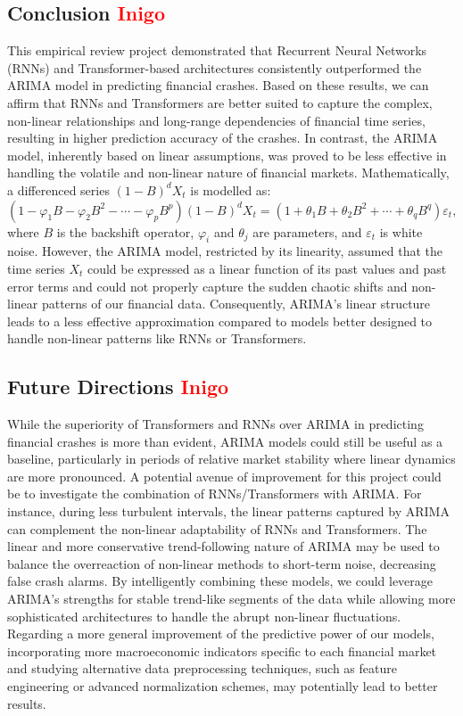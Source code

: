 \documentclass[12pt, letterpaper]{article}
\begin{document}
\subsection*{Conclusion \textcolor{red}{Inigo}}
This empirical review project demonstrated that Recurrent Neural Networks (RNNs) and Transformer-based architectures consistently outperformed the ARIMA model in predicting financial crashes. Based on these results, we can affirm that RNNs and Transformers are better suited to capture the complex, non-linear relationships and long-range dependencies of financial time series, resulting in higher prediction accuracy of the crashes. In contrast, the ARIMA model, inherently based on linear assumptions, was  proved to be less effective in handling the volatile and non-linear nature of financial markets. Mathematically, a differenced series \((1-B)^d X_t\) is modelled as: \[ (1 - \varphi_1 B - \varphi_2 B^2 - \cdots - \varphi_p B^p)(1-B)^d X_t = (1 + \theta_1 B + \theta_2 B^2 + \cdots + \theta_q B^q)\varepsilon_t, \] where \(B\) is the backshift operator, \(\varphi_i\) and \(\theta_j\) are parameters, and \(\varepsilon_t\) is white noise. However, the ARIMA model, restricted by its linearity, assumed that the time series $X_t$ could be expressed as a linear function of its past values and past error terms and could not properly capture the sudden chaotic shifts and non-linear patterns of our financial data. Consequently, ARIMA’s linear structure leads to a less effective approximation compared to models better designed to handle non-linear patterns like RNNs or Transformers.



\subsection*{Future Directions \textcolor{red}{Inigo}}
While the superiority of Transformers and RNNs over ARIMA in predicting financial crashes is more than evident, ARIMA models could still be useful as a baseline, particularly in periods of relative market stability where linear dynamics are more pronounced. A potential avenue of improvement for this project could be to investigate the combination of RNNs/Transformers with ARIMA. For instance, during less turbulent intervals, the linear patterns captured by ARIMA can complement the non-linear adaptability of RNNs and Transformers. The linear and more conservative trend-following nature of ARIMA may be used to balance the overreaction of non-linear methods to short-term noise, decreasing false crash alarms. By intelligently combining these models, we could leverage ARIMA’s strengths for stable trend-like segments of the data while allowing more sophisticated architectures to handle the abrupt non-linear fluctuations. Regarding a more general improvement of the predictive power of our models, incorporating more macroeconomic indicators specific to each financial market and studying alternative data preprocessing techniques, such as feature engineering or advanced normalization schemes, may potentially lead to better results.
\end{document}
